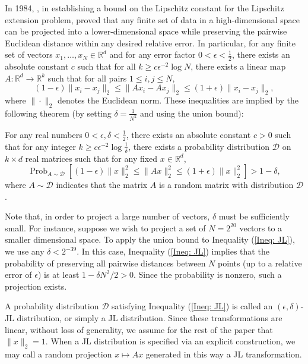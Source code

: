 \documentclass[twoside,11pt]{article}
\newcommand{\D}{\mathcal{D}}
\newcommand{\R}{{\mathbb R}}
\newcommand{\pPP}[2]{\operatorname{Prob}_{#2} \left[ #1 \right] }
\begin{document}
In 1984,  \cite{JohnsonLindenstrauss}, in establishing  a bound on the Lipschitz constant for the Lipschitz extension problem, proved that 
any finite set of data in a high-dimensional space can be projected into a lower-dimensional space while preserving the pairwise Euclidean distance within any desired relative error.
In particular,  for any finite set of vectors $x_1, \ldots, x_N \in \R^d$ and for any error factor $0 < \epsilon < \frac{1}{2}$, 
there exists an absolute  constant $c$ such that for all $k \geq c \epsilon^{-2} \log N$, 
there exists a linear map $A: \R^d \rightarrow \R^k$  such that for all pairs $1\leq i,j \leq N$,
		\[(1-\epsilon) \|x_i-x_j\|_2 \leq \|Ax_i - Ax_j\|_2 \leq (1+\epsilon) \|x_i-x_j\|_2, \]
where $\|\cdot \|_2$ denotes the Euclidean norm.  These inequalities are implied by the following theorem
(by setting $\delta = \frac{1}{N^2}$ and using the union bound):
\begin{theorem}\label{Thm: Main JL 2}
For any real numbers  $0< \epsilon, \delta <\frac{1}{2}$, there exists an absolute constant $c>0$ such that for  
any integer  $k \geq c \epsilon^{-2} \log \frac{1}{\delta}$, there exists a 
probability distribution $\D$ on $k \times d$ real matrices such that for any fixed $x \in \R^d$,
				\begin{equation} \label{Ineq: JL}
					\pPP{ (1-\epsilon)\|x\|_2^2 \leq \|Ax\|_2^2   \leq (1+\epsilon) \|x\|_2^2}{A \sim \D} > 1-\delta, 
				\end{equation}	
where $A\sim \D$ indicates that the  matrix $A$ is a random matrix with distribution $\D$.
\end{theorem}			
Note that, in order to  project  a large number of vectors, $\delta$ must be sufficiently small. For instance, suppose we wish to project a set of 
$N=2^{20}$ vectors to a smaller dimensional space.  To apply the union bound to Inequality (\ref{Ineq: JL}), we use any $\delta<2^{-39}$.  In this case, Inequality (\ref{Ineq: JL})  implies that  the probability of preserving all pairwise distances between $N$ points
(up to a relative error of $\epsilon$) is at least  $1-\delta N^2/2 >0$.  Since the probability is nonzero, such a projection exists.

A  probability distribution $\D$ satisfying  Inequality (\ref{Ineq: JL}) is called an    $(\epsilon,\delta)$-JL distribution,  or simply a JL distribution.  Since these transformations are linear, without loss of  generality,  
we assume for the rest of the paper that $\|x\|_2=1$.  When a JL distribution is specified via an explicit construction, we may call a random projection $x\mapsto Ax$ generated in this way a JL transformation.
		
\end{document}
